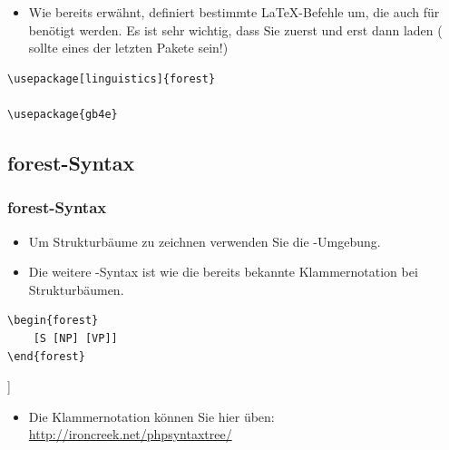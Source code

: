 \begin{frame}[fragile]

\begin{itemize}
	\item Wie bereits erwähnt, definiert  bestimmte \LaTeX -Befehle um, die auch für  benötigt werden. Es ist sehr wichtig, dass Sie \alert{zuerst  } und \alert{erst dann } laden ( sollte eines der letzten Pakete sein!)
\end{itemize}


\begin{lstlisting}
\usepackage[linguistics]{forest}

\usepackage{gb4e}
\end{lstlisting}

\end{frame}


\subsection{forest-Syntax}

\begin{frame}[fragile]
\frametitle{forest-Syntax}

\begin{itemize}
	\item Um Strukturbäume zu zeichnen verwenden Sie die -Umgebung.
	
	\item Die weitere -Syntax ist wie die bereits bekannte Klammernotation bei Strukturbäumen.
\end{itemize}


\begin{lstlisting}
\begin{forest}
	[S [NP] [VP]]
\end{forest}
\end{lstlisting}

\ea \begin{forest}
	[S [NP] [VP]]
\end{forest}
\z 

\begin{itemize}
	\item Die Klammernotation können Sie hier üben:
	\url{http://ironcreek.net/phpsyntaxtree/}

\end{itemize}

\end{frame}


